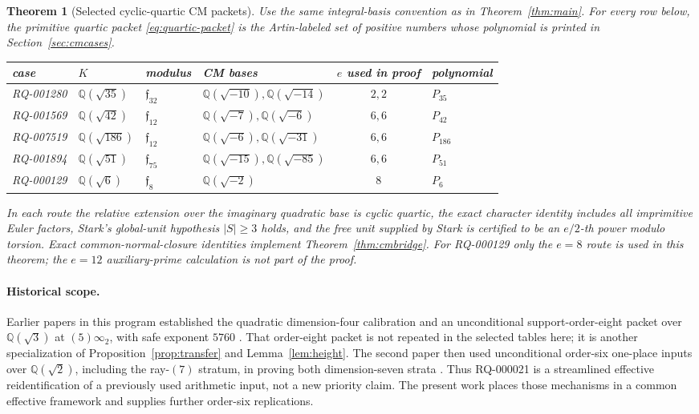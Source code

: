 \documentclass[11pt]{article}
\newtheorem{theorem}{Theorem}
\newcommand{\Q}{\mathbb Q}
\begin{document}
\begin{theorem}[Selected cyclic-quartic CM packets]\label{thm:cmcases}
Use the same integral-basis convention as in
Theorem~\ref{thm:main}.  For every row below, the primitive quartic
packet \eqref{eq:quartic-packet} is the Artin-labeled set of positive numbers whose
polynomial is printed in Section~\ref{sec:cmcases}.
\begin{center}\footnotesize
\begin{tabular}{@{}llllcl@{}}
\toprule
case & \(K\) & modulus
 & CM bases & \(e\) used in proof & polynomial\\
\midrule
RQ-001280 & \(\Q(\sqrt{35})\) &
\(\mathfrak f_{32}\)&
\(\Q(\sqrt{-10}),\Q(\sqrt{-14})\)&\(2,2\)&\(P_{35}\)\\
RQ-001569 & \(\Q(\sqrt{42})\) &
\(\mathfrak f_{12}\)&
\(\Q(\sqrt{-7}),\Q(\sqrt{-6})\)&\(6,6\)&\(P_{42}\)\\
RQ-007519 & \(\Q(\sqrt{186})\) &
\(\mathfrak f_{12}\)&
\(\Q(\sqrt{-6}),\Q(\sqrt{-31})\)&\(6,6\)&\(P_{186}\)\\
RQ-001894 & \(\Q(\sqrt{51})\) &
\(\mathfrak f_{75}\)&
\(\Q(\sqrt{-15}),\Q(\sqrt{-85})\)&\(6,6\)&\(P_{51}\)\\
RQ-000129 & \(\Q(\sqrt6)\) &
\(\mathfrak f_8\)&
\(\Q(\sqrt{-2})\)&\(8\)&\(P_6\)\\
\bottomrule
\end{tabular}
\end{center}
In each route the relative extension over the imaginary quadratic
base is cyclic quartic, the exact character identity includes all
imprimitive Euler factors, Stark's global-unit hypothesis
\(|S|\ge3\) holds, and the free unit supplied by Stark is certified
to be an \(e/2\)-th power modulo torsion.  Exact common-normal-closure
identities implement Theorem~\ref{thm:cmbridge}.  For RQ-000129 only the \(e=8\) route
is used in this theorem; the \(e=12\) auxiliary-prime calculation is
not part of the proof.
\end{theorem}

\paragraph{Historical scope.}
Earlier papers in this program established the quadratic
dimension-four calibration and an unconditional support-order-eight
packet over \(\Q(\sqrt3)\) at \((5)\infty_2\), with safe exponent
\(5760\) \cite{Zhao45}.  That order-eight packet is not repeated in
the selected tables here; it is another specialization of
Proposition~\ref{prop:transfer} and Lemma~\ref{lem:height}.  The
second paper then used unconditional order-six
one-place inputs over \(\Q(\sqrt2)\), including the ray-\((7)\)
stratum, in proving both dimension-seven strata
\cite{Zhao78}.  Thus RQ-000021 is a streamlined effective
reidentification of a previously used arithmetic input, not a new
priority claim.  The present work places those mechanisms in a common
effective framework and supplies further order-six replications.
\end{document}
